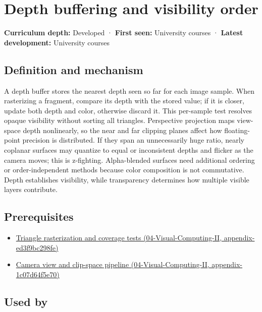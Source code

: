 \hypertarget{appendix-97578ed97952}{}
\section{Depth buffering and visibility order}\label{appendix-97578ed97952-depth-buffering-and-visibility-order}

\textbf{Curriculum depth:} Developed · \textbf{First seen:} University courses · \textbf{Latest development:} University courses

\subsection{Definition and mechanism}\label{appendix-97578ed97952-definition-and-mechanism}

A depth buffer stores the nearest depth seen so far for each image sample. When rasterizing a fragment, compare its depth with the stored value; if it is closer, update both depth and color, otherwise discard it. This per-sample test resolves opaque visibility without sorting all triangles. Perspective projection maps view-space depth nonlinearly, so the near and far clipping planes affect how floating-point precision is distributed. If they span an unnecessarily huge ratio, nearly coplanar surfaces may quantize to equal or inconsistent depths and flicker as the camera moves; this is z-fighting. Alpha-blended surfaces need additional ordering or order-independent methods because color composition is not commutative. Depth establishes visibility, while transparency determines how multiple visible layers contribute.

\subsection{Prerequisites}\label{appendix-97578ed97952-prerequisites}

\begin{itemize}
\tightlist
\item
  \href{../04-Visual-Computing-II/main.pdf\#nameddest=appendix-ed3f9bc298fe}{Triangle rasterization and coverage tests (04-Visual-Computing-II, appendix-ed3f9bc298fe)}
\item
  \href{../04-Visual-Computing-II/main.pdf\#nameddest=appendix-1c07d64f5e70}{Camera view and clip-space pipeline (04-Visual-Computing-II, appendix-1c07d64f5e70)}
\end{itemize}

\subsection{Used by}\label{appendix-97578ed97952-used-by}

